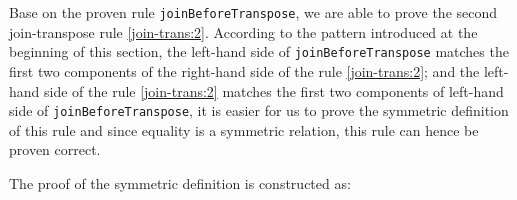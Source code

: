 \documentclass{l4proj}
\begin{document}
Base on the proven rule \texttt{joinBeforeTranspose}, we are able to prove the second join-transpose rule \ref{join-trans:2}. According to the pattern introduced at the beginning of this section, the left-hand side of \texttt{joinBeforeTranspose} matches the first two components of the right-hand side of the rule \ref{join-trans:2}; and the left-hand side of the rule \ref{join-trans:2} matches the first two components of left-hand side of \texttt{joinBeforeTranspose}, it is easier for us to prove the symmetric definition of this rule and since equality is a symmetric relation, this rule can hence be proven correct. 

The proof of the symmetric definition is constructed as:
\begin{code}%
\>[0]\<%
\\
\>[0]\AgdaSpace{}%
\AgdaSymbol{:}%
\>[608I]\AgdaSymbol{\{}\AgdaSpace{}%
\AgdaSpace{}%
\AgdaSpace{}%
\AgdaSymbol{:}\AgdaSpace{}%
\AgdaSymbol{\}}\AgdaSpace{}%
\AgdaSpace{}%
\AgdaSymbol{\{}\AgdaSpace{}%
\AgdaSymbol{:}\AgdaSpace{}%
\AgdaSymbol{\}}\AgdaSpace{}%
\AgdaSpace{}%
\AgdaSymbol{(}\AgdaSpace{}%
\AgdaSymbol{:}\AgdaSpace{}%
\AgdaSpace{}%
\AgdaSymbol{(}\AgdaSpace{}%
\AgdaSymbol{(}\AgdaSpace{}%
\AgdaSpace{}%
\AgdaSymbol{)}\AgdaSpace{}%
\AgdaSymbol{)}\AgdaSpace{}%
\AgdaSymbol{)}\AgdaSpace{}%
\<%
\\
\>[.][@{}l@{}]\<[608I]%
\>[11]\AgdaSpace{}%
\AgdaSymbol{(}\AgdaSpace{}%
\AgdaSymbol{(}\AgdaSpace{}%
\AgdaSpace{}%
\AgdaSymbol{))}\AgdaSpace{}%
\AgdaSpace{}%
\AgdaSpace{}%
\AgdaSpace{}%
\AgdaSymbol{(}\AgdaSpace{}%
\AgdaSymbol{)}\<%
\\
\>[0]\AgdaSpace{}%
\AgdaSpace{}%
\AgdaSymbol{=}\<%
\\
\>[0][@{}l@{\AgdaIndent{0}}]%
\>[2]\<%
\\
\>[2][@{}l@{\AgdaIndent{0}}]%
\>[4]\AgdaSpace{}%
\AgdaSymbol{(}\AgdaSpace{}%
\AgdaSymbol{(}\AgdaSpace{}%

\end{code}
\end{document}
